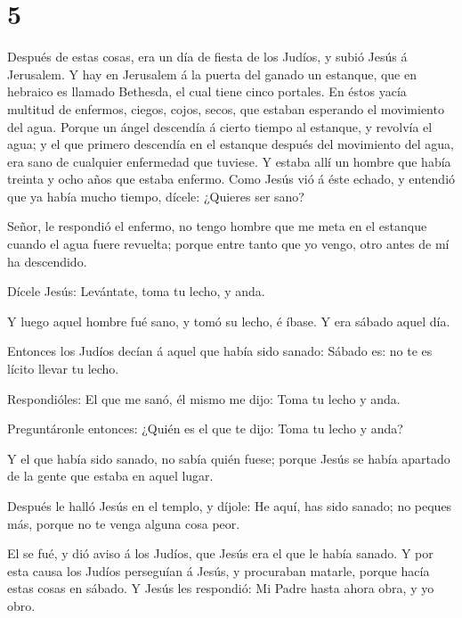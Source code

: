 \hypertarget{section-4}{%
\section{5}\label{section-4}}

 Después de estas cosas, era un día de fiesta de los Judíos,
y subió Jesús á Jerusalem.  Y hay en Jerusalem á la puerta
del ganado un estanque, que en hebraico es llamado Bethesda, el cual
tiene cinco portales.  En éstos yacía multitud de enfermos,
ciegos, cojos, secos, que estaban esperando el movimiento del agua.
 Porque un ángel descendía á cierto tiempo al estanque, y
revolvía el agua; y el que primero descendía en el estanque después del
movimiento del agua, era sano de cualquier enfermedad que tuviese.
 Y estaba allí un hombre que había treinta y ocho años que
estaba enfermo.  Como Jesús vió á éste echado, y entendió
que ya había mucho tiempo, dícele: ¿Quieres ser sano?

 Señor, le respondió el enfermo, no tengo hombre que me meta
en el estanque cuando el agua fuere revuelta; porque entre tanto que yo
vengo, otro antes de mí ha descendido.

 Dícele Jesús: Levántate, toma tu lecho, y anda.

 Y luego aquel hombre fué sano, y tomó su lecho, é íbase. Y
era sábado aquel día.

 Entonces los Judíos decían á aquel que había sido sanado:
Sábado es: no te es lícito llevar tu lecho.

 Respondióles: El que me sanó, él mismo me dijo: Toma tu
lecho y anda.

 Preguntáronle entonces: ¿Quién es el que te dijo: Toma tu
lecho y anda?

 Y el que había sido sanado, no sabía quién fuese; porque
Jesús se había apartado de la gente que estaba en aquel lugar.

 Después le halló Jesús en el templo, y díjole: He aquí,
has sido sanado; no peques más, porque no te venga alguna cosa peor.

 El se fué, y dió aviso á los Judíos, que Jesús era el que
le había sanado.  Y por esta causa los Judíos perseguían á
Jesús, y procuraban matarle, porque hacía estas cosas en sábado.
 Y Jesús les respondió: Mi Padre hasta ahora obra, y yo
obro.

